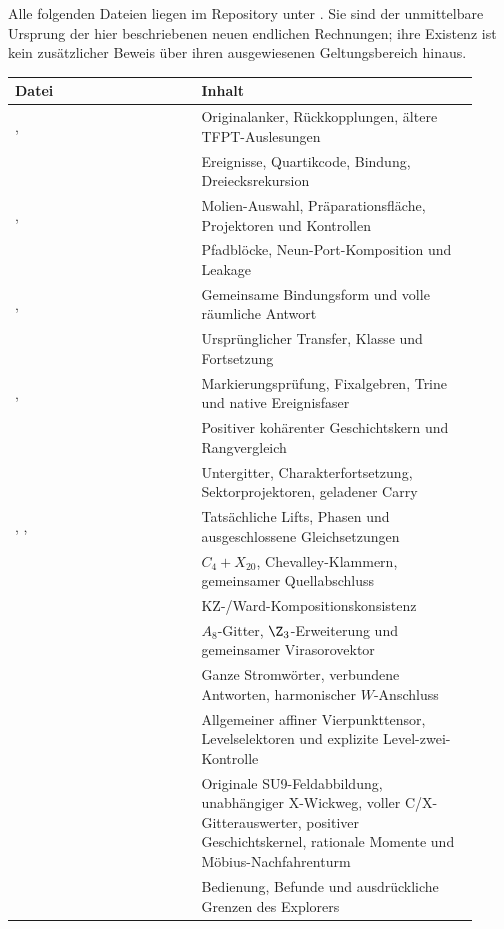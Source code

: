 Alle folgenden Dateien liegen im Repository unter . Sie sind der unmittelbare Ursprung der hier beschriebenen neuen endlichen Rechnungen; ihre Existenz ist kein zusätzlicher Beweis über ihren ausgewiesenen Geltungsbereich hinaus.
\begin{longtable}{L{0.37\linewidth}L{0.55\linewidth}}
\toprule
Datei & Inhalt\\\midrule\endhead
{},  & Originalanker, Rückkopplungen, ältere TFPT-Auslesungen\\
 & Ereignisse, Quartikcode, Bindung, Dreiecksrekursion\\
,  & Molien-Auswahl, Präparationsfläche, Projektoren und Kontrollen\\
 & Pfadblöcke, Neun-Port-Komposition und Leakage\\
,  & Gemeinsame Bindungsform und volle räumliche Antwort\\
 & Ursprünglicher Transfer, Klasse und Fortsetzung\\
,  & Markierungsprüfung, Fixalgebren, Trine und native Ereignisfaser\\
 & Positiver kohärenter Geschichtskern und Rangvergleich\\
 & Untergitter, Charakterfortsetzung, Sektorprojektoren, geladener Carry\\
, ,  & Tatsächliche Lifts, Phasen und ausgeschlossene Gleichsetzungen\\
 & $C_4+X_{20}$, Chevalley-Klammern, gemeinsamer Quellabschluss\\
 & KZ-/Ward-Kompositionskonsistenz\\
 & $A_8$-Gitter, $\Z_3$-Erweiterung und gemeinsamer Virasorovektor\\
 & Ganze Stromwörter, verbundene Antworten, harmonischer $W$-Anschluss\\
 & Allgemeiner affiner Vierpunkttensor, Levelselektoren und explizite Level-zwei-Kontrolle\\
 & Originale SU9-Feldabbildung, unabhängiger X-Wickweg, voller C/X-Gitterauswerter, positiver Geschichtskernel, rationale Momente und Möbius-Nachfahrenturm\\
 & Bedienung, Befunde und ausdrückliche Grenzen des Explorers\\\bottomrule
\end{longtable}

